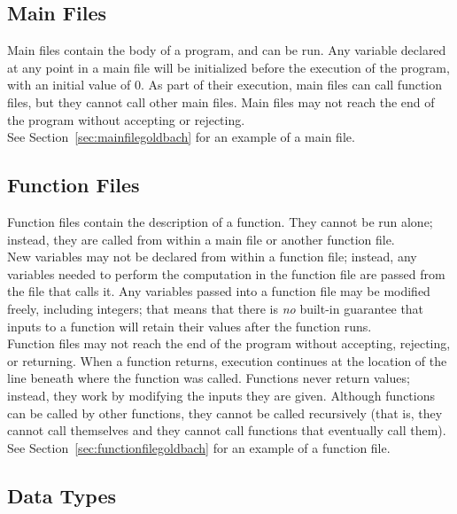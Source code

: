 \documentclass[11pt]{report}
\begin{document}
\subsection{Main Files}

Main files contain the body of a program, and can be run. Any variable declared at any point in a main file will be initialized before the execution of the program, with an initial value of 0. As part of their execution, main files can call function files, but they cannot call other main files. Main files may not reach the end of the program without accepting or rejecting. \\

See Section~\ref{sec:mainfilegoldbach} for an example of a main file.

\subsection{Function Files}

Function files contain the description of a function. They cannot be run alone; instead, they are called from within a main file or another function file. \\
  
New variables may not be declared from within a function file; instead, any variables needed to perform the computation in the function file are passed from the file that calls it. Any variables passed into a function file may be modified freely, including integers; that means that there is \emph{no} built-in guarantee that inputs to a function will retain their values after the function runs. \\

Function files may not reach the end of the program without accepting, rejecting, or returning. When a function returns, execution continues at the location of the line beneath where the function was called. Functions never return values; instead, they work by modifying the inputs they are given. Although functions can be called by other functions, they cannot be called recursively (that is, they cannot call themselves and they cannot call functions that eventually call them). \\

See Section~\ref{sec:functionfilegoldbach} for an example of a function file.

\subsection{Data Types}
\end{document}
